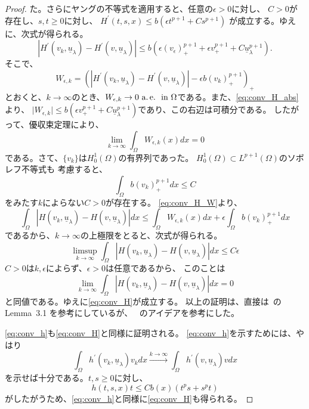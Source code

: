\begin{proof}
 た。さらにヤングの不等式を適用すると、任意の$\epsilon > 0$に対し、
 $C > 0$が存在し、$s, t \geq 0$に対し、
 $H^\prime(t, s, x) \leq b( \epsilon t^{p+1} + C s^{p+1})$
 が成立する。ゆえに、次式が得られる。
 \begin{equation}
  \left\lvert H^\prime(v_k, \underline{u}_\lambda) - H^\prime(v,
   \underline{u}_\lambda ) \right\rvert \leq b \left( \epsilon
   (v_\epsilon)_+^{p+1}  + \epsilon v_+^{p+1} + C
   \underline{u}_\lambda^{p+1} \right). \label{eq:conv_H_abs}
 \end{equation}
 そこで、
 \begin{equation}
  W_{\epsilon, k} = \left( \left\lvert H^\prime(v_k,
                            \underline{u}_\lambda) - H^\prime(v,
                            \underline{u}_\lambda) \right\rvert
  -\epsilon b (v_k)_+^{p+1}
                    \right)_+ \label{eq:conv_H_W}
 \end{equation}
 とおくと、$k \to \infty$のとき、$W_{\epsilon, k} \to 0 ~\text{a.\,e.}~ ~\text{in}~
 \Omega$である。また、\eqref{eq:conv_H_abs}より、
 $\lvert W_{\epsilon, k} \rvert \leq b \left( \epsilon v_+^{p+1} + C
 \underline{u}_\lambda^{p+1} \right)$であり、この右辺は可積分である。
 したがって、優収束定理により、
 \[
  \lim_{k \to \infty} \int_\Omega  W_{\epsilon, k}(x) dx = 0
 \]
 である。さて、$\{v_k \}$は$H_0^1(\Omega)$の有界列であった。
 $H_0^1(\Omega) \subset L^{p+1}(\Omega)$のソボレフ不等式も
 考慮すると、
 \[
   \int_\Omega b ( v_k )_+^{p+1} dx \leq C
 \]
 をみたす$k$によらない$C > 0$が存在する。
 \eqref{eq:conv_H_W}より、
 \[
  \int_\Omega \left\lvert H(v_k, \underline{u}_\lambda) - H(v,
 \underline{u}_\lambda ) \right\rvert dx \leq \int_\Omega W_{\epsilon,
 k} (x)dx + \epsilon \int_\Omega b(v_k)_+^{p+1} dx
 \]
 であるから、$k \to \infty$の上極限をとると、次式が得られる。
 \[
 \limsup_{k \to \infty} \int_\Omega \left\lvert H(v_k, \underline{u}_\lambda) - H(v,
 \underline{u}_\lambda ) \right\rvert dx \leq C \epsilon
 \]
 $C > 0$は$k, \epsilon$によらず、$\epsilon > 0$は任意であるから、
 このことは
 \[
  \lim_{k \to \infty}
 \int_\Omega \left\lvert H(v_k, \underline{u}_\lambda) - H(v,
 \underline{u}_\lambda ) \right\rvert dx = 0
 \]
 と同値である。ゆえに\eqref{eq:conv_H}が成立する。
 以上の証明は、直接は~\cite{MR2886160}の Lemma~3.1 を参考にしているが、
 ~\cite{MR699419}のアイデアを参考にした。
 
 \eqref{eq:conv_h}も\eqref{eq:conv_H}と同様に証明される。
 \eqref{eq:conv_h}を示すためには、やはり
 \[
  \int_\Omega h^\prime(v_k, \underline{u}_\lambda) v_k dx
 \xrightarrow{k \to \infty} \int_\Omega h^\prime (v,
 \underline{u}_\lambda ) v dx 
 \]
 を示せば十分である。$t, s \geq 0$に対し、
 \[
  h(t, s, x) t \leq C b(x) (t^p s + s^p t)
 \]
 がしたがうため、\eqref{eq:conv_h}と同様に\eqref{eq:conv_H}も得られる。
 

\end{proof}
